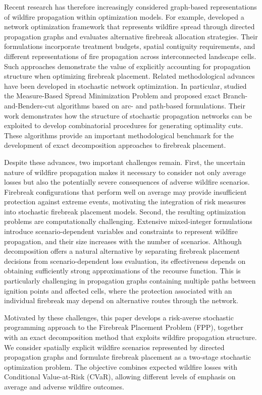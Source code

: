 \documentclass[a4paper,fleqn]{cas-sc}
\begin{document}
Recent research has therefore increasingly considered
graph-based representations of wildfire propagation
within optimization models. For example,
\citet{yemshanov2025graph} developed a network optimization
framework that represents wildfire spread through
directed propagation graphs and evaluates alternative
firebreak allocation strategies. Their formulations
incorporate treatment budgets, spatial contiguity
requirements, and different representations of fire
propagation across interconnected landscape cells.
Such approaches demonstrate the value of explicitly
accounting for propagation structure when optimizing
firebreak placement. Related methodological advances have been developed
in stochastic network optimization. In particular,
\citet{taninmics2024benders} studied the Measure-Based
Spread Minimization Problem and proposed exact
Branch-and-Benders-cut algorithms based on arc- and
path-based formulations. Their work demonstrates how
the structure of stochastic propagation networks can
be exploited to develop combinatorial procedures for
generating optimality cuts. These algorithms provide
an important methodological benchmark for the
development of exact decomposition approaches to
firebreak placement.

Despite these advances, two important challenges
remain. First, the uncertain nature of wildfire
propagation makes it necessary to consider not only
average losses but also the potentially severe
consequences of adverse wildfire scenarios.
Firebreak configurations that perform well on average
may provide insufficient protection against extreme
events, motivating the integration of risk measures
into stochastic firebreak placement models. Second,
the resulting optimization problems are computationally
challenging. Extensive mixed-integer formulations
introduce scenario-dependent variables and constraints
to represent wildfire propagation, and their size
increases with the number of scenarios. Although
decomposition offers a natural alternative by
separating firebreak placement decisions from
scenario-dependent loss evaluation, its effectiveness
depends on obtaining sufficiently strong approximations
of the recourse function. This is particularly
challenging in propagation graphs containing multiple
paths between ignition points and affected cells,
where the protection associated with an individual
firebreak may depend on alternative routes through
the network.

Motivated by these challenges, this paper develops
a risk-averse stochastic programming approach to
the Firebreak Placement Problem (FPP), together with
an exact decomposition method that exploits wildfire
propagation structure. We consider spatially explicit
wildfire scenarios represented by directed propagation
graphs and formulate firebreak placement as a two-stage
stochastic optimization problem. The objective combines
expected wildfire losses with Conditional Value-at-Risk
(CVaR), allowing different levels of emphasis on
average and adverse wildfire outcomes.
\end{document}
